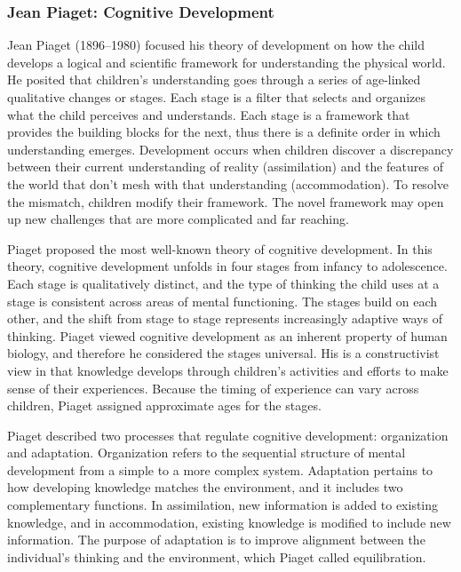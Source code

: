 \subsubsection{Jean Piaget: Cognitive Development}
Jean Piaget (1896–1980) focused his theory of development on how the child
develops a logical and scientific framework for understanding the physical
world. He posited that children’s understanding goes through a series of
age-linked qualitative changes or stages. Each stage is a filter that selects
and organizes what the child perceives and understands. Each stage is a
framework that provides the building blocks for the next, thus there is a
definite order in which understanding emerges. Development occurs when children
discover a discrepancy between their current understanding of reality
(assimilation) and the features of the world that don’t mesh with that
understanding (accommodation). To resolve the mismatch, children modify their
framework. The novel framework may open up new challenges that are more
complicated and far reaching. \cite{Feldman3}

Piaget proposed the most well-known theory of cognitive development. In this
theory, cognitive development unfolds in four stages from infancy to
adolescence. Each stage is qualitatively distinct, and the type of thinking the
child uses at a stage is consistent across areas of mental functioning. The
stages build on each other, and the shift from stage to stage represents
increasingly adaptive ways of thinking. Piaget viewed cognitive development
as an inherent property of human biology, and therefore he considered the
stages universal. His is a constructivist view in that knowledge develops
through children’s activities and efforts to make sense of their experiences.
Because the timing of experience can vary across children, Piaget assigned
approximate ages for the stages. \cite{Gauvain2022}

Piaget described two processes that regulate cognitive development:
organization and adaptation. Organization refers to the sequential structure of
mental development from a simple to a more complex system. Adaptation pertains
to how developing knowledge matches the environment, and it includes two
complementary functions. In assimilation, new information is added to existing
knowledge, and in accommodation, existing knowledge is modified to include new
information. The purpose of adaptation is to improve alignment between the
individual’s thinking and the environment, which Piaget called equilibration.
\cite{Gauvain2022}

